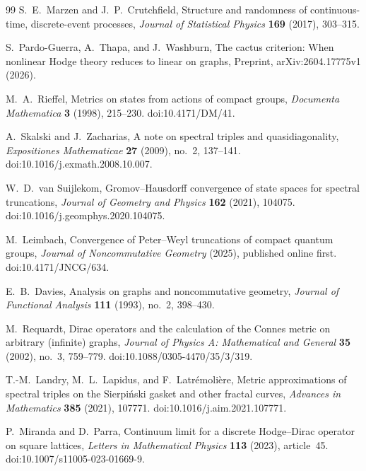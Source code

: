 \documentclass[11pt]{article}
\theoremstyle{definition}
\theoremstyle{remark}
\theoremstyle{definition}
\theoremstyle{remark}
\begin{document}
\begin{thebibliography}{99}
S.~E.~Marzen and J.~P.~Crutchfield,
\newblock Structure and randomness of continuous-time, discrete-event processes,
\newblock \emph{Journal of Statistical Physics} \textbf{169} (2017), 303--315.

S.~Pardo-Guerra, A.~Thapa, and J.~Washburn,
\newblock The cactus criterion: When nonlinear Hodge theory reduces to linear on graphs,
\newblock Preprint, arXiv:2604.17775v1 (2026).

M.~A.~Rieffel,
\newblock Metrics on states from actions of compact groups,
\newblock \emph{Documenta Mathematica} \textbf{3} (1998), 215--230.
\newblock doi:10.4171/DM/41.

A.~Skalski and J.~Zacharias,
\newblock A note on spectral triples and quasidiagonality,
\newblock \emph{Expositiones Mathematicae} \textbf{27} (2009), no.~2, 137--141.
\newblock doi:10.1016/j.exmath.2008.10.007.

W.~D.~van Suijlekom,
\newblock Gromov--Hausdorff convergence of state spaces for spectral truncations,
\newblock \emph{Journal of Geometry and Physics} \textbf{162} (2021), 104075.
\newblock doi:10.1016/j.geomphys.2020.104075.

M.~Leimbach,
\newblock Convergence of Peter--Weyl truncations of compact quantum groups,
\newblock \emph{Journal of Noncommutative Geometry} (2025), published online first.
\newblock doi:10.4171/JNCG/634.

E.~B.~Davies,
\newblock Analysis on graphs and noncommutative geometry,
\newblock \emph{Journal of Functional Analysis} \textbf{111} (1993), no.~2,
398--430.

M.~Requardt,
\newblock Dirac operators and the calculation of the Connes metric on arbitrary
(infinite) graphs,
\newblock \emph{Journal of Physics A: Mathematical and General} \textbf{35}
(2002), no.~3, 759--779.
\newblock doi:10.1088/0305-4470/35/3/319.

T.-M.~Landry, M.~L.~Lapidus, and F.~Latr\'emoli\`ere,
\newblock Metric approximations of spectral triples on the Sierpi\'nski gasket
and other fractal curves,
\newblock \emph{Advances in Mathematics} \textbf{385} (2021), 107771.
\newblock doi:10.1016/j.aim.2021.107771.

P.~Miranda and D.~Parra,
\newblock Continuum limit for a discrete Hodge--Dirac operator on square lattices,
\newblock \emph{Letters in Mathematical Physics} \textbf{113} (2023), article~45.
\newblock doi:10.1007/s11005-023-01669-9.


\end{thebibliography}
\end{document}
